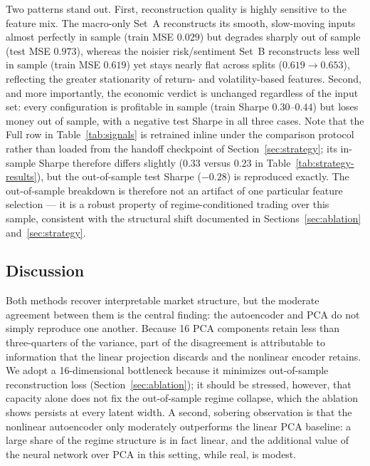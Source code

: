 \documentclass[conference]{IEEEtran}
\begin{document}
Two patterns stand out. First, reconstruction quality is highly sensitive to the
feature mix. The macro-only Set~A reconstructs its smooth, slow-moving inputs
almost perfectly in sample (train MSE $0.029$) but degrades sharply out of sample
(test MSE $0.973$), whereas the noisier risk/sentiment Set~B reconstructs less
well in sample (train MSE $0.619$) yet stays nearly flat across splits
($0.619 \rightarrow 0.653$), reflecting the greater stationarity of return- and
volatility-based features. Second, and more importantly, the economic verdict is
unchanged regardless of the input set: every configuration is profitable in sample
(train Sharpe $0.30$--$0.44$) but loses money out of sample, with a negative test
Sharpe in all three cases. Note that the Full row in Table~\ref{tab:signals} is
retrained inline under the comparison protocol rather than loaded from the handoff
checkpoint of Section~\ref{sec:strategy}; its in-sample Sharpe therefore differs
slightly ($0.33$ versus $0.23$ in Table~\ref{tab:strategy-results}), but the
out-of-sample test Sharpe ($-0.28$) is reproduced exactly. The out-of-sample breakdown is therefore not
an artifact of one particular feature selection --- it is a robust property of
regime-conditioned trading over this sample, consistent with the structural shift
documented in Sections~\ref{sec:ablation} and~\ref{sec:strategy}.

\subsection{Discussion}

Both methods recover interpretable market structure, but the moderate agreement
between them is the central finding: the autoencoder and PCA do not simply
reproduce one another. Because 16 PCA components retain less than three-quarters
of the variance, part of the disagreement is attributable to information that the
linear projection discards and the nonlinear encoder retains. We adopt a
16-dimensional bottleneck because it minimizes out-of-sample reconstruction loss
(Section~\ref{sec:ablation}); it should be stressed, however, that capacity alone
does not fix the out-of-sample regime collapse, which the ablation shows persists
at every latent width. A second, sobering observation is that the nonlinear
autoencoder only moderately outperforms the linear PCA baseline: a large share of
the regime structure is in fact linear, and the additional value of the neural
network over PCA in this setting, while real, is modest.
\end{document}
